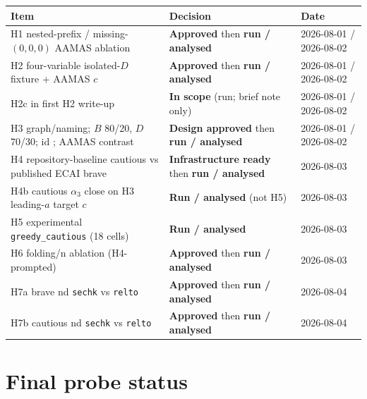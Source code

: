 \documentclass[11pt]{article}
\begin{document}
\begin{center}
\small
\setlength{\tabcolsep}{3pt}
\begin{tabular}{@{}L{0.47\textwidth}L{0.26\textwidth}L{0.19\textwidth}@{}}
\toprule
Item & Decision & Date \\
\midrule
H1 nested-prefix / missing-\((0,0,0)\) AAMAS ablation &
  \textbf{Approved} then \textbf{run / analysed} & 2026-08-01 / 2026-08-02 \\
H2 four-variable isolated-\(D\) fixture + AAMAS \(c\) &
  \textbf{Approved} then \textbf{run / analysed} & 2026-08-01 / 2026-08-02 \\
H2c in first H2 write-up &
  \textbf{In scope} (run; brief note only) & 2026-08-01 / 2026-08-02 \\
H3 graph/naming; \(B\) 80/20, \(D\) 70/30; id
  ; AAMAS contrast &
  \textbf{Design approved} then \textbf{run / analysed} & 2026-08-01 / 2026-08-02 \\
H4 repository-baseline cautious vs published ECAI brave &
  \textbf{Infrastructure ready} then \textbf{run / analysed} & 2026-08-03 \\
H4b cautious $\alpha_3$ close on H3 leading-$a$ target \(c\) &
  \textbf{Run / analysed} (not H5) & 2026-08-03 \\
H5 experimental \texttt{greedy\_cautious} (18 cells) &
  \textbf{Run / analysed} & 2026-08-03 \\
H6 folding/n ablation (H4-prompted) &
  \textbf{Approved} then \textbf{run / analysed} & 2026-08-03 \\
H7a brave nd \texttt{sechk} vs \texttt{relto} &
  \textbf{Approved} then \textbf{run / analysed} & 2026-08-04 \\
H7b cautious nd \texttt{sechk} vs \texttt{relto} &
  \textbf{Approved} then \textbf{run / analysed} & 2026-08-04 \\
\bottomrule
\end{tabular}
\end{center}

\section{Final probe status}
\end{document}

